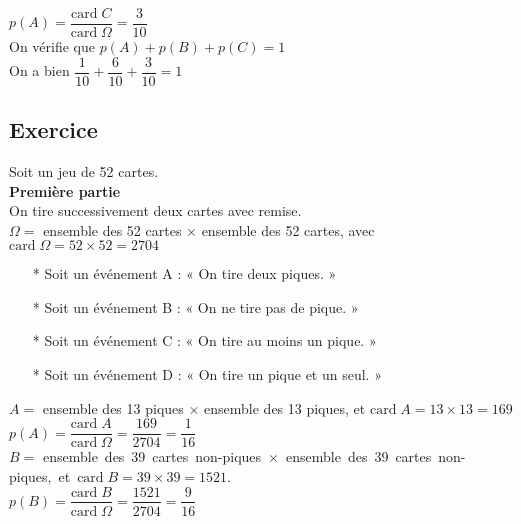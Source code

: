 $ p\left(A\right) = \dfrac{\mathrm{card} \; C}{\mathrm{card} \; \Omega} = \dfrac{3}{10} $ \\

On vérifie que $p\left(A\right) + p\left(B\right) + p\left(C\right) = 1 $ \\

On a bien $\dfrac{1}{10} + \dfrac{6}{10} + \dfrac{3}{10} = 1 $

\newpage 

\subsection{Exercice }

Soit un jeu de 52 cartes. \\

\textbf{Première partie} \\

On tire successivement deux cartes avec remise. \\

$\Omega =$  ensemble des 52 cartes $ \times $ ensemble des 52 cartes, avec $\mathrm{card} \; \Omega = 52 \times 52 = 2704 $ \\

\begin{itemize}
\item[*] Soit un événement A : « On tire deux piques. » 
\item[*] Soit un événement B : « On ne tire pas de pique. » 
\item[*] Soit un événement C : « On tire au moins un pique. » 
\item[*] Soit un événement D : « On tire un pique et un seul. » 
\end{itemize}

\vspace*{.3cm }
$ A = $ ensemble des 13 piques $ \times $ ensemble des 13 piques, et $\mathrm{card} \; A = 13 \times 13 = 169 $ \\

$ p\left(A\right) = \dfrac{\mathrm{card} \; A}{\mathrm{card} \; \Omega} = \dfrac{169}{2704} = \dfrac{1}{16} $ \\

$ B = $ \hbox{ensemble des 39 cartes non-piques $ \times $ ensemble des 39 cartes non-piques, et $\mathrm{card} \; B = 39 \times 39 = 1521 $.} \\

$ p\left(B\right) = \dfrac{\mathrm{card} \; B}{\mathrm{card} \; \Omega} = \dfrac{1521}{2704} = \dfrac{9}{16} $ \\

